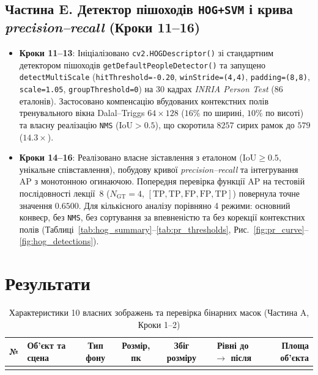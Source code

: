 \documentclass[14pt, a4paper]{extarticle}
\begin{document}
\subsection{Частина E. Детектор пішоходів \texttt{HOG+SVM} і крива \emph{precision--recall} (Кроки 11--16)}
\begin{itemize}
    \item \textbf{Кроки 11--13}: Ініціалізовано \texttt{cv2.HOGDescriptor()} зі стандартним детектором пішоходів \texttt{getDefaultPeopleDetector()} та запущено \texttt{detectMultiScale} (\texttt{hitThreshold=-0.20}, \texttt{winStride=(4,4)}, \texttt{padding=(8,8)}, \texttt{scale=1.05}, \texttt{groupThreshold=0}) на 30 кадрах \emph{INRIA Person Test} ($86$ еталонів). Застосовано компенсацію вбудованих контекстних полів тренувального вікна Dalal--Triggs $64 \times 128$ ($16\%$ по ширині, $10\%$ по висоті) та власну реалізацію \texttt{NMS} ($\text{IoU} > 0.5$), що скоротила $8257$ сирих рамок до $579$ ($14.3\times$).
    \item \textbf{Кроки 14--16}: Реалізовано власне зіставлення з еталоном ($\text{IoU} \ge 0.5$, унікальне співставлення), побудову кривої \emph{precision--recall} та інтегрування $\text{AP}$ з монотонною огинаючою. Попередня перевірка функції $\text{AP}$ на тестовій послідовності лекції~8 ($N_{\text{GT}}=4$, $[\text{TP}, \text{TP}, \text{FP}, \text{FP}, \text{TP}]$) повернула точне значення $\mathbf{0.6500}$. Для кількісного аналізу порівняно 4 режими: основний конвеєр, без \texttt{NMS}, без сортування за впевненістю та без корекції контекстних полів (Таблиці~\ref{tab:hog_summary}--\ref{tab:pr_thresholds}, Рис.~\ref{fig:pr_curve}--\ref{fig:hog_detections}).
\end{itemize}

\newpage
\section{Результати}

\begin{table}[htbp]
\centering
\caption{Характеристики 10 власних зображень та перевірка бінарних масок (Частина A, Кроки 1--2)}
\label{tab:dataset_masks}
\scriptsize
\setlength{\tabcolsep}{3.5pt}
\begin{tabularx}{\textwidth}{c Y c c c c r}
\toprule
№ & Об'єкт та сцена & Тип фону & Розмір, пк & Збіг розміру & Рівні до $\to$ після & Площа об'єкта \\
\midrule
{}
\bottomrule
\end{tabularx}
\end{table}
\end{document}
